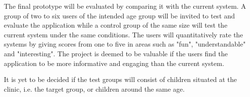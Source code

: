 The final prototype will be evaluated by comparing it with the current system. A group of two to six users of the intended age group will be invited to test and evaluate the application while a control group of the same size will test the current system under the same conditions. The users will quantitatively rate the systems by giving scores from one to five in areas such as "fun", "understandable" and "interesting". The project is deemed to be valuable if the users find the application to be more informative and engaging than the current system.

It is yet to be decided if the test groups will consist of children situated at the clinic, i.e. the target group, or children around the same age.
